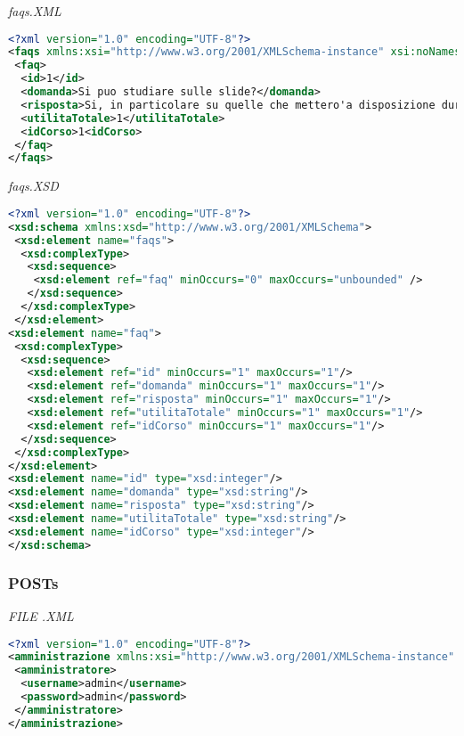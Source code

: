 \documentclass [a4paper,11pt]{book}
\begin{document}
\medskip

\emph{faqs.XML}

\begin{lstlisting}[language=XML]
<?xml version="1.0" encoding="UTF-8"?>
<faqs xmlns:xsi="http://www.w3.org/2001/XMLSchema-instance" xsi:noNamespaceSchemaLocation="faqs.xsd">
 <faq>
  <id>1</id>
  <domanda>Si puo studiare sulle slide?</domanda>
  <risposta>Si, in particolare su quelle che mettero'a disposizione durante il corso</risposta>
  <utilitaTotale>1</utilitaTotale>
  <idCorso>1<idCorso>
 </faq>
</faqs>
\end{lstlisting}

\medskip

\emph{faqs.XSD}

\begin{lstlisting}[language=XML]
<?xml version="1.0" encoding="UTF-8"?>
<xsd:schema xmlns:xsd="http://www.w3.org/2001/XMLSchema">
 <xsd:element name="faqs">
  <xsd:complexType>
   <xsd:sequence>
    <xsd:element ref="faq" minOccurs="0" maxOccurs="unbounded" />
   </xsd:sequence>
  </xsd:complexType>
 </xsd:element>
<xsd:element name="faq">
 <xsd:complexType>
  <xsd:sequence>
   <xsd:element ref="id" minOccurs="1" maxOccurs="1"/>
   <xsd:element ref="domanda" minOccurs="1" maxOccurs="1"/>
   <xsd:element ref="risposta" minOccurs="1" maxOccurs="1"/>
   <xsd:element ref="utilitaTotale" minOccurs="1" maxOccurs="1"/>
   <xsd:element ref="idCorso" minOccurs="1" maxOccurs="1"/>
  </xsd:sequence>
 </xsd:complexType>
</xsd:element>
<xsd:element name="id" type="xsd:integer"/>
<xsd:element name="domanda" type="xsd:string"/>
<xsd:element name="risposta" type="xsd:string"/>
<xsd:element name="utilitaTotale" type="xsd:string"/>
<xsd:element name="idCorso" type="xsd:integer"/>
</xsd:schema>
\end{lstlisting}

\medskip

\subsubsection{POSTs}

\emph{FILE .XML}

\begin{lstlisting}[language=XML]
<?xml version="1.0" encoding="UTF-8"?>
<amministrazione xmlns:xsi="http://www.w3.org/2001/XMLSchema-instance" xsi:noNamespaceSchemaLocation="amministrazione.xsd">
 <amministratore>
  <username>admin</username>
  <password>admin</password>
 </amministratore>
</amministrazione>
\end{lstlisting}
\end{document}
